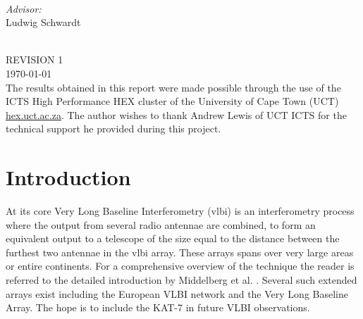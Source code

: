 \documentclass[a4paper,10pt]{article}
\begin{document}
\begin{titlepage}
\begin{minipage}{0.4\textwidth}
\begin{flushleft}
\end{flushleft}
\end{minipage}
~
\begin{minipage}{0.4\textwidth}
\begin{flushright} \large
\emph{Advisor:} \\
Ludwig Schwardt
\end{flushright}
\end{minipage}\\[3cm]


{\Large REVISION 1}\\[1.0cm] 
{\large \today}\\[1.5cm] %

{The results obtained in this report were made possible through the use of the ICTS High Performance HEX cluster 
of the University of Cape Town (UCT) \url{hex.uct.ac.za}. The author wishes to thank Andrew Lewis of UCT ICTS for 
the technical support he provided during this project.}


\vfill %

\end{titlepage}

\printglossary[style=long]
\pagebreak
\tableofcontents
\pagebreak
\listoffigures
\listoftables
\pagebreak
\section{Introduction}
At its core Very Long Baseline Interferometry (\gls{vlbi}) is an interferometry process where the output from several radio antennae are 
combined, to form an equivalent output to a telescope of the size equal to the distance between the furthest two antennae in the \gls{vlbi} array. These
arrays spans over very large areas or entire continents. For a comprehensive overview of the technique the reader is referred to the detailed introduction 
by Middelberg et al. \cite{middelberg2008high}. Several such extended arrays exist including the European VLBI network and the Very Long Baseline Array. The 
hope is to include the KAT-7 in future VLBI observations.
\end{document}
